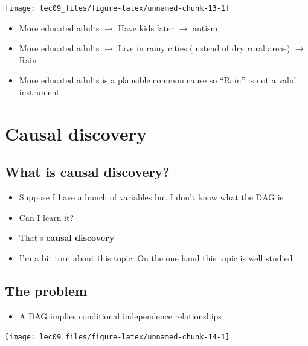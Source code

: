 \documentclass[]{article}
\providecommand{\tightlist}{%
  \setlength{\itemsep}{0pt}\setlength{\parskip}{0pt}}
\begin{document}
\begin{center}\texttt{[image: lec09\_files/figure-latex/unnamed-chunk-13-1]} \end{center}

\begin{itemize}
\item
  More educated adults \(\rightarrow\) Have kids later \(\rightarrow\)
  autism
\item
  More educated adults \(\rightarrow\) Live in rainy cities (instead of
  dry rural areas) \(\rightarrow\) Rain
\item
  More educated adults is a plausible common cause so ``Rain'' is not a
  valid instrument
\end{itemize}

\hypertarget{causal-discovery}{%
\section{Causal discovery}\label{causal-discovery}}

\hypertarget{what-is-causal-discovery}{%
\subsection{What is causal discovery?}\label{what-is-causal-discovery}}

\begin{itemize}
\item
  Suppose I have a bunch of variables but I don't know what the DAG is
\item
  Can I learn it?
\item
  That's \textbf{causal discovery}
\item
  I'm a bit torn about this topic. On the one hand this topic is well
  studied
\end{itemize}

\hypertarget{the-problem}{%
\subsection{The problem}\label{the-problem}}

\begin{itemize}
\tightlist
\item
  A DAG implies conditional independence relationships
\end{itemize}

\begin{center}\texttt{[image: lec09\_files/figure-latex/unnamed-chunk-14-1]} \end{center}
\end{document}
